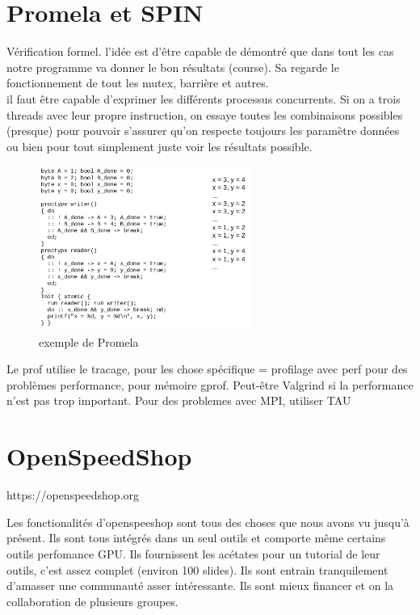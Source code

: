 \documentclass[oneside]{book}
\begin{document}
\section{Promela et SPIN}
Vérification formel. l'idée est d'être capable de démontré que dans tout les cas notre programme va donner le bon résultats (course). Sa regarde le fonctionnement de tout les mutex, barrière et autres. \\

il faut être capable d'exprimer les différents processus concurrents. Si on a trois threads avec leur propre instruction, on essaye toutes les combinaisons possibles (presque) pour pouvoir s'assurer qu'on respecte toujours les paramètre données ou bien pour tout simplement juste voir les résultats possible.\\ 

\begin{figure}[!ht]
\centering
\includegraphics[width = 7cm]{promela.png}
\caption{exemple de Promela}
\end{figure}

Le prof utilise le tracage, pour les chose spécifique = profilage avec perf pour des problèmes performance, pour mémoire gprof. Peut-être Valgrind si la performance n'est pas trop important. Pour des problemes avec MPI, utiliser TAU
\section{OpenSpeedShop}

https://openspeedshop.org

Les fonctionalités d'openspeeshop sont tous des choses que nous avons vu jusqu'à présent. Ils sont tous intégrés dans un seul outils et comporte même certains outils perfomance GPU. Ils fournissent les acétates pour un tutorial de leur outils, c'est assez complet (environ 100 slides). Ils sont entrain tranquilement d'amasser une communauté asser intéressante. Ils sont mieux financer et on la collaboration de plusieurs groupes.\\
\end{document}
